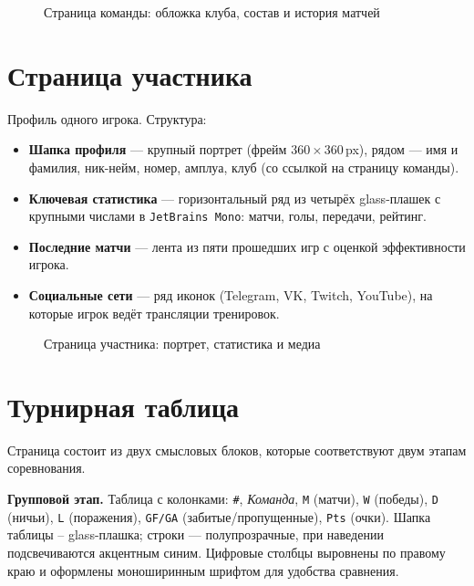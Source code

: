 \begin{figure}[h]
  \centering
  \caption{Страница команды: обложка клуба, состав и история матчей}
  \label{fig:team}
\end{figure}

\section{Страница участника}

Профиль одного игрока. Структура:

\begin{itemize}
  \item \textbf{Шапка профиля} --- крупный портрет (фрейм
        \(360\times360\,\)px), рядом --- имя и фамилия, ник-нейм,
        номер, амплуа, клуб (со ссылкой на страницу команды).
  \item \textbf{Ключевая статистика} --- горизонтальный ряд из
        четырёх glass-плашек с крупными числами в
        \texttt{JetBrains~Mono}: матчи, голы, передачи, рейтинг.
  \item \textbf{Последние матчи} --- лента из пяти прошедших игр
        с оценкой эффективности игрока.
  \item \textbf{Социальные сети} --- ряд иконок (Telegram, VK,
        Twitch, YouTube), на которые игрок ведёт трансляции
        тренировок.
\end{itemize}

\begin{figure}[h]
  \centering
  \caption{Страница участника: портрет, статистика и медиа}
  \label{fig:player}
\end{figure}

\section{Турнирная таблица}

Страница состоит из двух смысловых блоков, которые соответствуют
двум этапам соревнования.

\textbf{Групповой этап.} Таблица с колонками: \texttt{\#},
\textit{Команда}, \texttt{M} (матчи), \texttt{W} (победы),
\texttt{D} (ничьи), \texttt{L} (поражения), \texttt{GF/GA}
(забитые/пропущенные), \texttt{Pts} (очки). Шапка таблицы --
glass-плашка; строки --- полупрозрачные, при наведении подсвечиваются
акцентным синим. Цифровые столбцы выровнены по правому краю и
оформлены моноширинным шрифтом для удобства сравнения.

